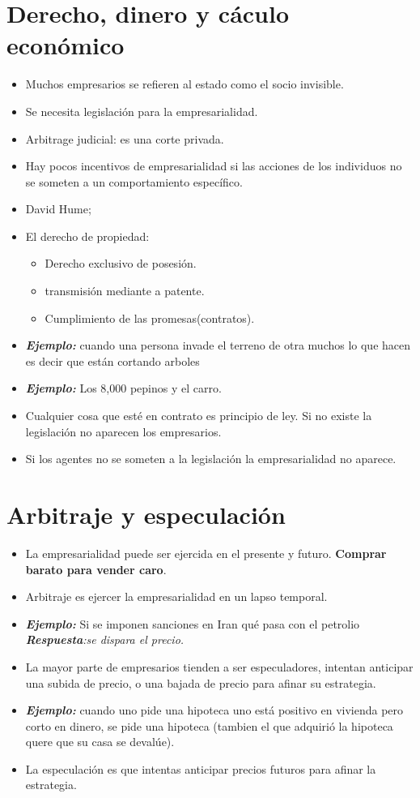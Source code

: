\section{Derecho, dinero y cáculo económico}
\begin{itemize}
    \item Muchos empresarios se refieren al estado como el socio invisible. 
    \item Se necesita legislación para la empresarialidad.
    \item Arbitrage judicial: es una corte privada.
    \item Hay pocos incentivos de empresarialidad si las acciones de los individuos no se someten a un comportamiento específico.
    \item David Hume; 
    
    \item El derecho de propiedad:
    \begin{itemize}
        \item Derecho exclusivo de posesión.
        \item transmisión mediante a patente.
        \item Cumplimiento de las promesas(contratos).
    \end{itemize}
    
    \item \textbf{\emph{Ejemplo:}} cuando una persona invade el terreno de otra muchos lo que hacen es decir que están cortando arboles 
    \item \textbf{\emph{Ejemplo:}} Los 8,000 pepinos y el carro.
    \item Cualquier cosa que esté en contrato es principio de ley. Si no existe la legislación no aparecen los empresarios.
    \item Si los agentes no se someten a la legislación la empresarialidad no aparece.
\end{itemize}

\section{Arbitraje y especulación}
\begin{itemize}
    \item La empresarialidad puede ser ejercida en el presente y futuro. \textbf{Comprar barato para vender caro}. 
    \item Arbitraje es ejercer la empresarialidad en un lapso temporal.
    \item \textbf{\emph{Ejemplo:}} Si se imponen sanciones en Iran qué pasa con el petrolio \emph{\textbf{Respuesta}:se dispara el precio.}
    \item La mayor parte de empresarios tienden a ser especuladores, intentan anticipar una subida de precio, o una bajada de precio para afinar su estrategia.
    \item \textbf{\emph{Ejemplo:}} cuando uno pide una hipoteca uno está positivo en vivienda pero corto en dinero, se pide una hipoteca (tambien el que adquirió la hipoteca quere que su casa se devalúe).
    \item La especulación es que intentas anticipar precios futuros para afinar la estrategia.
\end{itemize}

